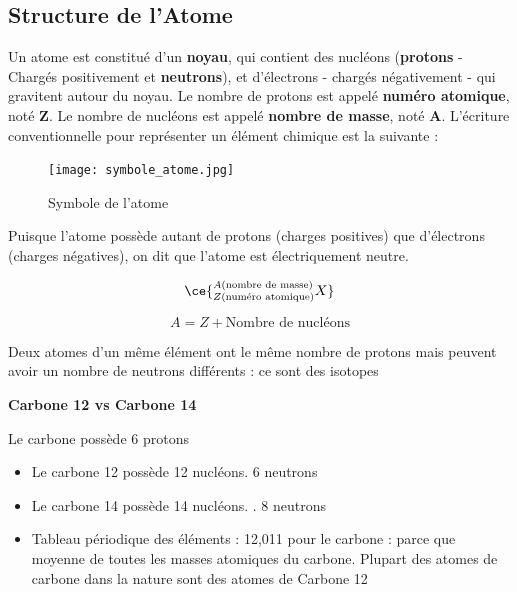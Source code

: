 \documentclass[a4paper,12pt]{article}
\begin{document}
\subsection{Structure de l'Atome}

\begin{tcolorbox}[colback=green!10!white, colframe=green!75!black, title=Structure de l'atome]
  Un atome est constitué d’un \textbf{noyau}, qui contient des nucléons (\textbf{protons} - Chargés positivement et \textbf{neutrons}),
et d’électrons - chargés négativement - qui gravitent autour du noyau. Le nombre de protons est appelé \textbf{numéro
atomique}, noté \textbf{Z}. Le nombre de nucléons est appelé \textbf{nombre de masse}, noté \textbf{A}. L’écriture
conventionnelle pour représenter un élément chimique est la suivante : 
\end{tcolorbox}

\begin{figure}[H]
  \centering
  \texttt{[image: symbole\_atome.jpg]}
  \caption{\label{} Symbole de l'atome}
\end{figure}

Puisque l'atome possède autant de protons (charges positives) que d'électrons (charges négatives), on dit que l'atome est électriquement neutre. \par 
\vspace{1em}

\[\ce{^{A \text{(nombre de masse)}}_{Z \text{(numéro atomique)}} X}\]

\[A = Z + \text{Nombre de nucléons}\] \par

Deux atomes d'un même élément ont le même nombre de protons mais peuvent avoir un nombre de neutrons différents : ce sont des isotopes 

\vspace{1em}
\textbf{Carbone 12 vs Carbone 14}

Le carbone possède 6 protons

\begin{itemize}[noitemsep]
  \item Le carbone 12 possède 12 nucléons.  6 neutrons
  \item Le carbone 14 possède 14 nucléons. . 8 neutrons
  \item Tableau périodique des éléments : 12,011 pour le carbone : parce que moyenne de toutes les masses atomiques du carbone. Plupart des atomes de carbone dans la nature sont des atomes de Carbone 12
\end{itemize}
\end{document}
